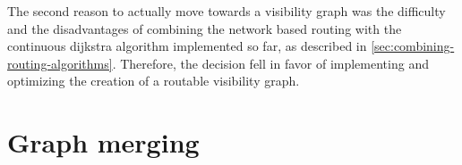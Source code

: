 		The second reason to actually move towards a visibility graph was the difficulty and the disadvantages of combining the network based routing with the continuous dijkstra algorithm implemented so far, as described in \cref{sec:combining-routing-algorithms}.
		Therefore, the decision fell in favor of implementing and optimizing the creation of a routable visibility graph.
	
\section{Graph merging}